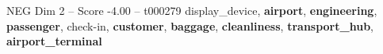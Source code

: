 \begin{textsample}{NEG Dim 2 – Score -4.00 – t000279}  \label{ex:f2_neg_012}
display\_device, \textbf{airport}, \textbf{engineering}, \textbf{passenger}, check-in, \textbf{customer}, \textbf{baggage}, \textbf{cleanliness}, \textbf{transport\_hub}, \textbf{airport\_terminal}

\end{textsample}
